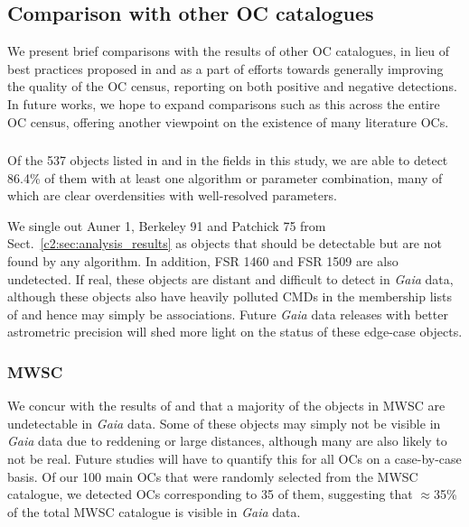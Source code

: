 \subsection{Comparison with other OC catalogues}\label{app:c2:comparison_with_cats}

We present brief comparisons with the results of other OC catalogues, in lieu of best practices proposed in \cite{cantat-gaudin_clusters_2020} and as a part of efforts towards generally improving the quality of the OC census, reporting on both positive and negative detections. In future works, we hope to expand comparisons such as this across the entire OC census, offering another viewpoint on the existence of many literature OCs.


\subsubsection{\cite{cantat-gaudin_clusters_2020}}

Of the 537 objects listed in \cite{cantat-gaudin_clusters_2020} and in the fields in this study, we are able to detect 86.4\% of them with at least one algorithm or parameter combination, many of which are clear overdensities with well-resolved parameters.

We single out Auner 1, Berkeley 91 and Patchick 75 from Sect.~\ref{c2:sec:analysis_results} as objects that should be detectable but are not found by any algorithm. In addition, FSR 1460 and FSR 1509 are also undetected. If real, these objects are distant and difficult to detect in \emph{Gaia} data, although these objects also have heavily polluted CMDs in the membership lists of \cite{cantat-gaudin_clusters_2020} and hence may simply be associations. Future \emph{Gaia} data releases with better astrometric precision will shed more light on the status of these edge-case objects.


\subsubsection{MWSC}

We concur with the results of \cite{cantat-gaudin_gaia_2018} and \cite{cantat-gaudin_clusters_2020} that a majority of the objects in MWSC are undetectable in \emph{Gaia} data. Some of these objects may simply not be visible in \emph{Gaia} data due to reddening or large distances, although many are also likely to not be real. Future studies will have to quantify this for all OCs on a case-by-case basis. Of our 100 main OCs that were randomly selected from the MWSC catalogue, we detected OCs corresponding to 35 of them, suggesting that $\approx$35\% of the total MWSC catalogue is visible in \emph{Gaia} data. 

